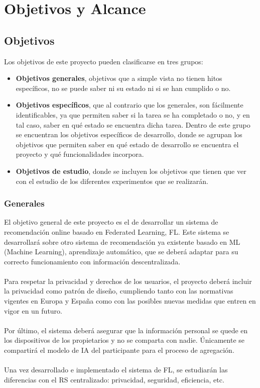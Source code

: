 \chapter{Objetivos y Alcance}
\thispagestyle{fancy}
\section{Objetivos}
Los objetivos de este proyecto pueden clasificarse en tres grupos:
\begin{itemize}
    \item \textbf{Objetivos generales}, objetivos que a simple vista no tienen hitos específicos, no se puede saber ni su estado ni si se han cumplido o no.
    \item \textbf{Objetivos específicos}, que al contrario que los generales, son fácilmente identificables, ya que permiten saber si la tarea se ha completado o no, y en tal caso, saber en qué estado se encuentra dicha tarea. Dentro de este grupo se encuentran los objetivos específicos de desarrollo, donde se agrupan los objetivos que permiten saber en qué estado de desarrollo se encuentra el proyecto y qué funcionalidades incorpora. 
    \item \textbf{Objetivos de estudio}, donde se incluyen los objetivos que tienen que ver con el estudio de los diferentes experimentos que se realizarán. 
\end{itemize}

\subsection{Generales}
El objetivo general de este proyecto es el de desarrollar un sistema de recomendación online basado en Federated Learning, FL. Este sistema se desarrollará sobre otro sistema de recomendación ya existente basado en ML (Machine Learning), aprendizaje automático, que se deberá adaptar para su correcto funcionamiento con información descentralizada.
\\ \\
Para respetar la privacidad y derechos de los usuarios, el proyecto deberá incluir la privacidad como patrón de diseño, cumpliendo tanto con las normativas vigentes en Europa y España como con las posibles nuevas medidas que entren en vigor en un futuro. 
\\ \\
Por último, el sistema deberá asegurar que la información personal se quede en los dispositivos de los propietarios y no se comparta con nadie. Únicamente se compartirá el modelo de IA del participante para el proceso de agregación.
\\ \\
Una vez desarrollado e implementado el sistema de FL, se estudiarán las diferencias con el RS centralizado: privacidad, seguridad, eficiencia, etc.

